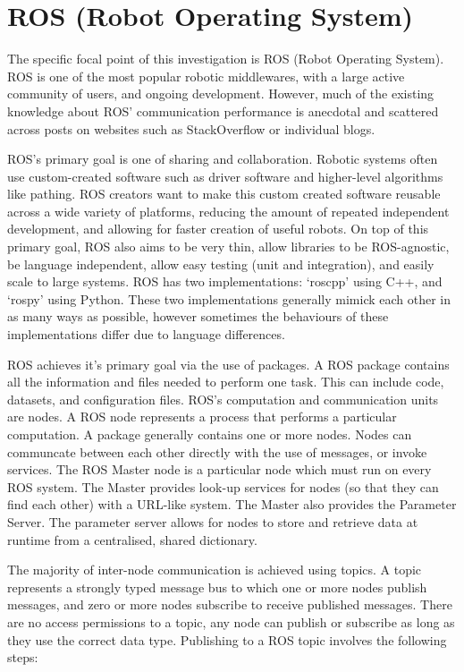 \documentclass[../dissertation.tex]{subfiles}
\begin{document}
\section{ROS (Robot Operating System)}
\label{background-ros}

The specific focal point of this investigation is ROS (Robot Operating System). ROS is one of the most popular robotic middlewares, with a large active community of users, and ongoing development. However, much of the existing knowledge about ROS' communication performance is anecdotal and scattered across posts on websites such as StackOverflow or individual blogs.

ROS's primary goal is one of sharing and collaboration. Robotic systems often use custom-created software such as driver software and higher-level algorithms like pathing. ROS creators want to make this custom created software reusable across a wide variety of platforms, reducing the amount of repeated independent development, and allowing for faster creation of useful robots. On top of this primary goal, ROS also aims to be very thin, allow libraries to be ROS-agnostic, be language independent, allow easy testing (unit and integration), and easily scale to large systems. ROS has two implementations: `roscpp' using C++, and `rospy' using Python. These two implementations generally mimick each other in as many ways as possible, however sometimes the behaviours of these implementations differ due to language differences.

ROS achieves it's primary goal via the use of packages. A ROS package contains all the information and files needed to perform one task. This can include code, datasets, and configuration files. ROS's computation and communication units are nodes. A ROS node represents a process that performs a particular computation. A package generally contains one or more nodes. Nodes can communcate between each other directly with the use of messages, or invoke services. The ROS Master node is a particular node which must run on every ROS system. The Master provides look-up services for nodes (so that they can find each other) with a URL-like system. The Master also provides the Parameter Server. The parameter server allows for nodes to store and retrieve data at runtime from a centralised, shared dictionary.

The majority of inter-node communication is achieved using topics. A topic represents a strongly typed message bus to which one or more nodes publish messages, and zero or more nodes subscribe to receive published messages. There are no access permissions to a topic, any node can publish or subscribe as long as they use the correct data type. Publishing to a ROS topic involves the following steps:
\end{document}
